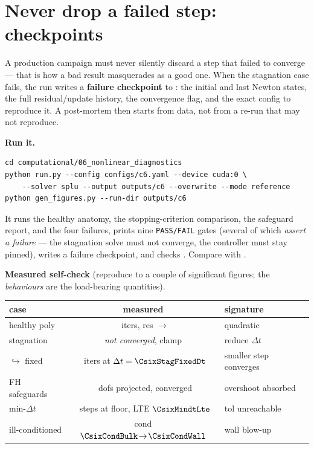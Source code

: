 \section{Never drop a failed step: checkpoints}

A production campaign must never silently discard a step that failed to
converge --- that is how a bad result masquerades as a good one. When the
stagnation case fails, the run writes a \textbf{failure checkpoint} to
: the initial and last Newton states,
the full residual/update history, the convergence flag, and the exact config
to reproduce it. A post-mortem then starts from data, not from a re-run that
may not reproduce.

\begin{runbox}
\textbf{Run it.}
\begin{lstlisting}
cd computational/06_nonlinear_diagnostics
python run.py --config configs/c6.yaml --device cuda:0 \
    --solver splu --output outputs/c6 --overwrite --mode reference
python gen_figures.py --run-dir outputs/c6
\end{lstlisting}
It runs the healthy anatomy, the stopping-criterion comparison, the safeguard
report, and the four failures, prints nine \texttt{PASS/FAIL} gates (several of
which \emph{assert a failure} --- the stagnation solve must not converge, the
controller must stay pinned), writes a failure checkpoint, and checks
\file{baseline.yaml}. Compare with \file{EXPECTED.md}.
\end{runbox}

\begin{keybox}
\textbf{Measured self-check} (reproduce to a couple of significant figures; the
\emph{behaviours} are the load-bearing quantities).
\begin{center}\small
\begin{tabular}{lcl}
\toprule
case & measured & signature \\
\midrule
healthy poly & \CsixHealthyIters\ iters, res $\to$ \CsixHealthyResEnd & quadratic \\
stagnation & \emph{not converged}, clamp \CsixStagClampFrac & reduce $\Delta t$ \\
\;\;$\hookrightarrow$ fixed & \CsixStagFixedIters\ iters at $\Delta t=\CsixStagFixedDt$ & smaller step converges \\
FH safeguards & \CsixSafeProjDofs\ dofs projected, converged & overshoot absorbed \\
min-$\Delta t$ & \CsixMindtSteps\ steps at floor, LTE $\CsixMindtLte$ & tol unreachable \\
ill-conditioned & cond $\CsixCondBulk\!\to\!\CsixCondWall$ & wall blow-up \\
\bottomrule
\end{tabular}
\end{center}
\end{keybox}

